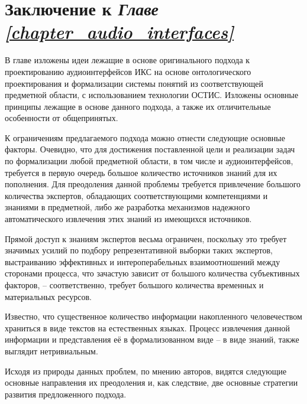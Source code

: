 \section*{Заключение к \textit{Главе \ref{chapter_audio_interfaces}~}}

В главе изложены идеи лежащие в основе оригинального подхода к проектированию аудиоинтерфейсов ИКС на основе онтологического проектирования и формализации системы понятий из соответствующей предметной области, с использованием технологии ОСТИС. Изложены основные принципы лежащие в основе данного подхода, а также их отличительные особенности от общепринятых.

К ограничениям предлагаемого подхода можно отнести следующие основные факторы. Очевидно, что для достижения поставленной цели и реализации задач по формализации любой предметной области, в том числе и аудиоинтерфейсов, требуется в первую очередь большое количество источников знаний для их пополнения. Для преодоления данной проблемы требуется привлечение большого количества экспертов, обладающих соответствующими компетенциями и знаниями в предметной, либо же разработка механизмов надежного автоматического извлечения этих знаний из имеющихся источников.

Прямой доступ к знаниям экспертов весьма ограничен, поскольку это требует значимых усилий по подбору репрезентативной выборки таких экспертов, выстраиванию эффективных и интероперабельных взаимоотношений между сторонами процесса, что зачастую зависит от большого количества субъективных факторов, – соответственно, требует большого количества временных и материальных ресурсов.

Известно, что существенное количество информации накопленного человечеством храниться в виде текстов на естественных языках. Процесс извлечения данной информации и представления её в формализованном виде – в виде знаний, также выглядит нетривиальным.
 
Исходя из природы данных проблем, по мнению авторов, видятся следующие основные направления их преодоления и, как следствие, две основные стратегии развития предложенного подхода.

